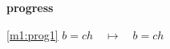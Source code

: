 \textbf{progress}
\begin{block}
\item[ \eqref{m1:prog1} ]{$b = ch \quad \mapsto\quad b = ch$} %
\end{block}
